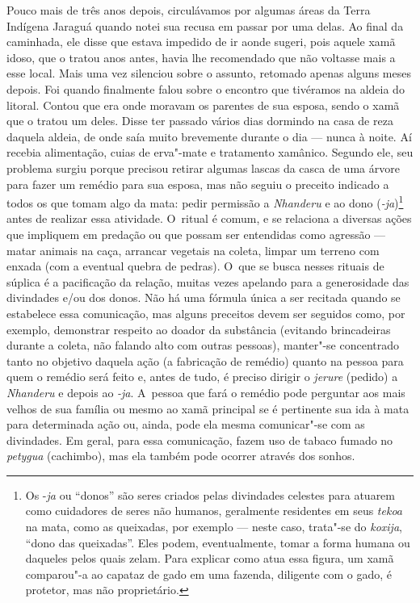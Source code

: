 Pouco mais de três anos depois, circulávamos por algumas áreas da Terra
Indígena Jaraguá quando notei sua recusa em passar por uma delas. Ao
final da caminhada, ele disse que estava impedido de ir aonde sugeri,
pois aquele xamã idoso, que o tratou anos antes, havia lhe recomendado
que não voltasse mais a esse local. Mais uma vez silenciou sobre o
assunto, retomado apenas alguns meses depois. Foi quando finalmente
falou sobre o encontro que tivéramos na aldeia do litoral. Contou que
era onde moravam os parentes de sua esposa, sendo o xamã que o tratou
um deles. Disse ter passado vários dias dormindo na casa de reza
daquela aldeia, de onde saía muito brevemente durante o dia --- nunca à
noite. Aí recebia alimentação, cuias de erva"-mate e tratamento
xamânico. Segundo ele, seu problema surgiu porque precisou retirar
algumas lascas da casca de uma árvore para fazer um remédio para sua
esposa, mas não seguiu o preceito indicado a todos os que tomam algo da
mata: pedir permissão a \emph{Nhanderu} e ao dono (\emph{-ja})\footnote{Os -\emph{ja} ou ``donos''
são seres criados pelas divindades celestes para atuarem como
cuidadores de seres não humanos, geralmente residentes em seus \emph{tekoa} na
mata, como as queixadas, por exemplo --- neste caso, trata"-se do \emph{koxija},
``dono das queixadas''. Eles podem, eventualmente, tomar a forma humana
ou daqueles pelos quais zelam. Para explicar como atua essa figura, um
xamã comparou"-a ao capataz de gado em uma fazenda, diligente com o
gado, é protetor, mas não proprietário.} antes de realizar essa
atividade. O~ritual é comum, e se relaciona a diversas ações que
impliquem em predação ou que possam ser entendidas como agressão ---
matar animais na caça, arrancar vegetais na coleta, limpar um terreno
com enxada (com a eventual quebra de pedras). O~que se busca nesses
rituais de súplica é a pacificação da relação, muitas vezes apelando
para a generosidade das divindades e/ou dos donos. Não há uma fórmula
única a ser recitada quando se estabelece essa comunicação, mas alguns
preceitos devem ser seguidos como, por exemplo, demonstrar respeito ao
doador da substância (evitando brincadeiras durante a coleta, não
falando alto com outras pessoas), manter"-se concentrado tanto no
objetivo daquela ação (a fabricação de remédio) quanto na pessoa para
quem o remédio será feito e, antes de tudo, é preciso dirigir o \emph{jerure}
(pedido) a \emph{Nhanderu} e depois ao \emph{-ja}. A~pessoa que fará o remédio pode
perguntar aos mais velhos de sua família ou mesmo ao xamã principal se
é pertinente sua ida à mata para determinada ação ou, ainda, pode ela
mesma comunicar"-se com as divindades. Em geral, para essa comunicação,
fazem uso de tabaco fumado no \emph{petygua} (cachimbo), mas ela também
pode ocorrer através dos sonhos. 

